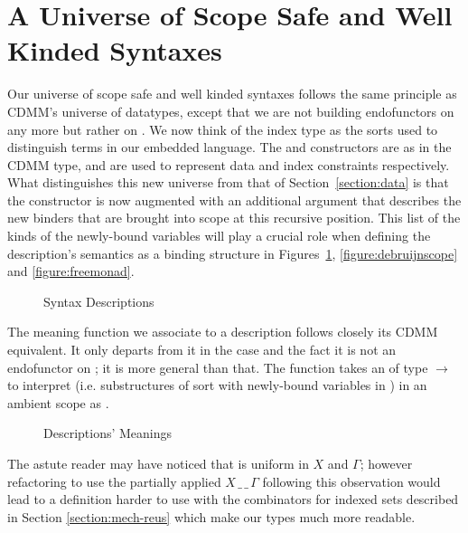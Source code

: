 \section{A Universe of Scope Safe and Well Kinded Syntaxes}\label{section:universe}

Our universe of scope safe and well kinded syntaxes follows the same principle
as CDMM's universe of datatypes, except that we are not building endofunctors on
 any more but rather on { }. We now think of the index
type  as the sorts
used to distinguish terms in our embedded language. The  and
 constructors are as in the CDMM  type, and are used to
represent data and index constraints respectively.
What distinguishes this new universe  from that of Section~\ref{section:data}
is that the
 constructor
is now augmented with an additional { } argument that describes
the new binders that are brought into scope at this recursive position. This
list of the kinds of the newly-bound variables will play a crucial role when
defining the description's semantics as a binding structure in
Figures~\ref{figure:syntaxmeaning}, \ref{figure:debruijnscope} and \ref{figure:freemonad}.

\begin{figure}[h]
\caption{Syntax Descriptions}
\end{figure}

The meaning function  we associate to a description follows closely
its CDMM equivalent. It only departs from it in the  case and the fact
it is not an endofunctor on  ; it is more general than that.
The function takes an  of type {  $\rightarrow$  }
to interpret {  } (i.e. substructures of sort  with
newly-bound variables in ) in an ambient scope  as {   }.

\begin{figure}[h]
\caption{Descriptions' Meanings}\label{figure:syntaxmeaning}
\end{figure}

The astute reader may have noticed that  is uniform in $X$ and $\Gamma$; however
refactoring  to use the partially applied $X\,\_\,\_\,\Gamma$ following
this observation would lead to a definition harder to use with the
combinators for indexed sets described in Section \ref{section:mech-reus}
which make our types much more readable.

